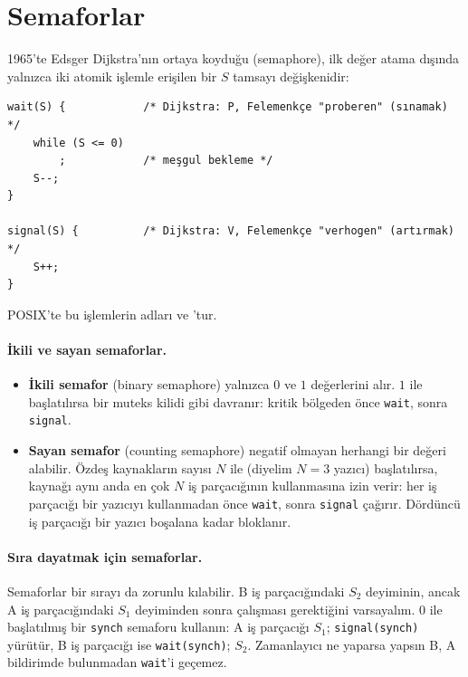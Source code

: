\section{Semaforlar}

1965'te Edsger Dijkstra'nın ortaya koyduğu  (semaphore), ilk değer atama dışında yalnızca iki atomik işlemle erişilen bir $S$ tamsayı değişkenidir:
\begin{lstlisting}
wait(S) {            /* Dijkstra: P, Felemenkçe "proberen" (sınamak) */
    while (S <= 0)
        ;            /* meşgul bekleme */
    S--;
}

signal(S) {          /* Dijkstra: V, Felemenkçe "verhogen" (artırmak) */
    S++;
}
\end{lstlisting}
POSIX'te bu işlemlerin adları  ve 'tur.

\paragraph{İkili ve sayan semaforlar.}
\begin{itemize}
  \item \textbf{İkili semafor} (binary semaphore) yalnızca $0$ ve $1$ değerlerini alır. $1$ ile başlatılırsa bir muteks kilidi gibi davranır: kritik bölgeden önce \texttt{wait}, sonra \texttt{signal}.
  \item \textbf{Sayan semafor} (counting semaphore) negatif olmayan herhangi bir değeri alabilir. Özdeş kaynakların sayısı $N$ ile (diyelim $N=3$ yazıcı) başlatılırsa, kaynağı aynı anda en çok $N$ iş parçacığının kullanmasına izin verir: her iş parçacığı bir yazıcıyı kullanmadan önce \texttt{wait}, sonra \texttt{signal} çağırır. Dördüncü iş parçacığı bir yazıcı boşalana kadar bloklanır.
\end{itemize}

\paragraph{Sıra dayatmak için semaforlar.} Semaforlar bir sırayı da zorunlu kılabilir. B iş parçacığındaki $S_2$ deyiminin, ancak A iş parçacığındaki $S_1$ deyiminden sonra çalışması gerektiğini varsayalım. $0$ ile başlatılmış bir \texttt{synch} semaforu kullanın: A iş parçacığı $S_1$; \texttt{signal(synch)} yürütür, B iş parçacığı ise \texttt{wait(synch)}; $S_2$. Zamanlayıcı ne yaparsa yapsın B, A bildirimde bulunmadan \texttt{wait}'i geçemez.

